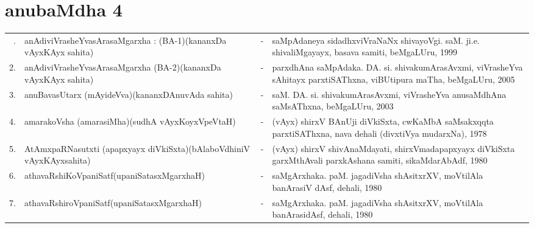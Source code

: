 \chapter*{anubaMdha 4}

{\renewcommand{\arraystretch}{1.3}
\begin{longtable}{rp{6cm}cp{9cm}<{\raggedright}@{}}
\hline
\endfirsthead
\hline
\endhead
\hline
\endfoot
\endlastfoot
1. & anAdiviVrasheYvasArasaMgarxha : (BA-1)\newline (kananxDa vAyxKAyx sahita) &-& saMpAdaneya sidadhxviVraNaNx shivayoVgi. saM. ji.e. shivaliMgayayx, basava samiti, beMgaLUru, 1999\\
2. & anAdiviVrasheYvasArasaMgarxha (BA-2)\newline (kananxDa vAyxKAyx sahita) &-& parxdhAna saMpAdaka. DA. si. shivakumArasAvxmi, viVrasheYva sAhitayx parxtiSAThxna, viBUtipura maTha, beMgaLUru, 2005\\
3. & anuBavasUtarx (mAyideVva)\newline (kananxDAnuvAda sahita) &-& saM. DA. si. shivakumArasAvxmi, viVrasheYva anusaMdhAna saMsAThxna, beMgaLUru, 2003\\
4. & amarakoVsha (amarasiMha)\newline (sudhA vAyxKoyxVpeVtaH) &-& (vAyx) shirxV BAnUji diVkiSxta, cwKaMbA saMsakxqqta parxtiSAThxna, nava dehali (divxtiVya mudarxNa), 1978\\
5. & AtAmxpaRNasutxti (apapxyayx diVkiSxta)\newline (bAlaboVdhiniV vAyxKAyxsahita) &-& (vAyx) shirxV shivAnaMdayati, shirxVmadapapxyayx diVkiSxta garxMthAvali parxkAshana samiti, sikaMdarAbAdf, 1980\\
6. & athavaRshiKoVpaniSatf\newline (upaniSatasxMgarxhaH) &-& saMgArxhaka. paM. jagadiVsha shAsitxrXV, moVtilAla banArasiV dAsf, dehali, 1980\\
7. & athavaRshiroVpaniSatf\newline (upaniSatasxMgarxhaH) &-& saMgArxhaka. paM. jagadiVsha shAsitxrXV, moVtilAla banArasidAsf, dehali, 1980\\

\end{longtable}}
